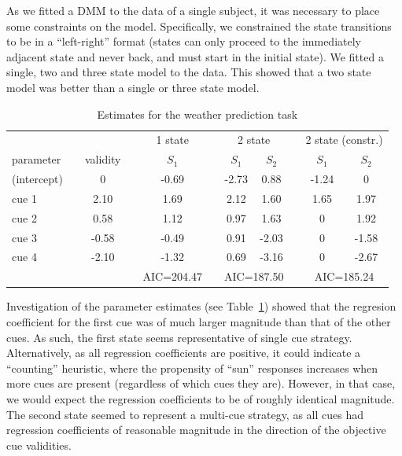 \documentclass[a4paper,12pt,man,english]{apa} %
\begin{document}
As we fitted a DMM to the data of a single subject, it was necessary
to place some constraints on the model.  Specifically, we constrained
the state transitions to be in a ``left-right'' format (states can
only proceed to the immediately adjacent state and never back, and
must start in the initial state).  We fitted a single, two and three
state model to the data.  This showed that a two state model was
better than a single or three state model.

\begin{table}
\caption{Estimates for the weather prediction task}
\label{tab:WPT}
\begin{tabular}{lcccccccccc} \hline
 & & \multicolumn{1}{c}{} && \multicolumn{1}{c}{1 state} & & \multicolumn{2}{c}{2 state} &&
 \multicolumn{2}{c}{2 state (constr.)} \\ \cline{5-5} \cline{7-8} \cline{10-11}
parameter && validity && $S_1$ & & $S_1$ & $S_2$ & & $S_1$ & $S_2$ \\ \hline
(intercept) && 0 && -0.69 & & -2.73 & 0.88 & & -1.24 & 0 \\
cue 1 && 2.10 && 1.69 && 2.12 & 1.60 && 1.65 & 1.97 \\
cue 2 && 0.58 && 1.12 && 0.97 & 1.63 && 0 & 1.92 \\
cue 3 && -0.58 && -0.49 && 0.91 & -2.03 && 0 & -1.58 \\
cue 4 && -2.10 && -1.32 && 0.69 & -3.16 && 0 & -2.67 \\ \hline
 & & & & \multicolumn{1}{c}{AIC=204.47} & & \multicolumn{2}{c}{AIC=187.50} &&
 \multicolumn{2}{c}{AIC=185.24}
\end{tabular}
\end{table}

Investigation of the parameter estimates (see Table~\ref{tab:WPT})
showed that the regresion coefficient for the first cue was of much
larger magnitude than that of the other cues. As such, the first
state seems representative of single cue strategy.  Alternatively, as
all regression coefficients are positive, it could indicate a
``counting'' heuristic, where the propensity of ``sun'' responses
increases when more cues are present (regardless of which cues they
are).  However, in that case, we would expect the regression
coefficients to be of roughly identical magnitude. The second state
seemed to represent a multi-cue strategy, as all cues had regression
coefficients of reasonable magnitude in the direction of the objective
cue validities.
\end{document}
